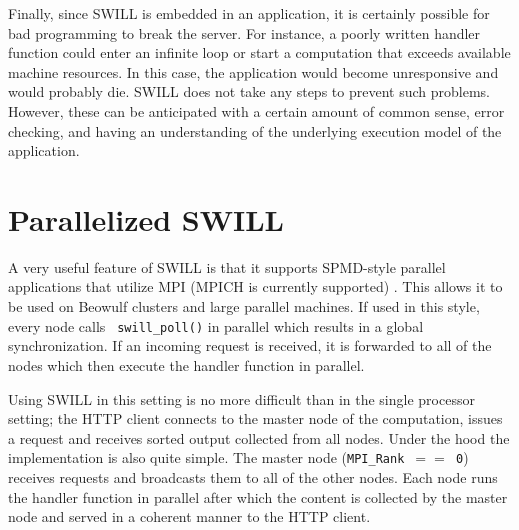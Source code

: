 Finally, since SWILL is embedded in an application, it is certainly
possible for bad programming to break the server.  For instance, a
poorly written handler function could enter an infinite loop or start
a computation that exceeds available machine resources.  In this case,
the application would become unresponsive and would probably die.
SWILL does not take any steps to prevent such problems.  However, these
can be anticipated with a certain amount of common sense, error
checking, and having an understanding of the underlying
execution model of the application.

\section{Parallelized SWILL}

A very useful feature of SWILL is that it supports SPMD-style parallel
applications that utilize MPI (MPICH is currently supported)
\cite{mpich}.  This allows it to be used on Beowulf clusters and large
parallel machines.  If used in this style, every node calls {\tt
swill\_poll()} in parallel which results in a global synchronization.
If an incoming request is received, it is forwarded to all of the
nodes which then execute the handler function in parallel.

Using SWILL in this setting is no more difficult than in the single
processor setting; the HTTP client connects to the master node of the
computation, issues a request and receives sorted output collected
from all nodes.  Under the hood the implementation is also quite
simple. The master node ({\tt MPI\_Rank $==$ 0})
receives requests and broadcasts them to all of the other nodes.
Each node runs the handler function in parallel after which
the content is collected by the master node and served in a coherent
manner to the HTTP client. 

